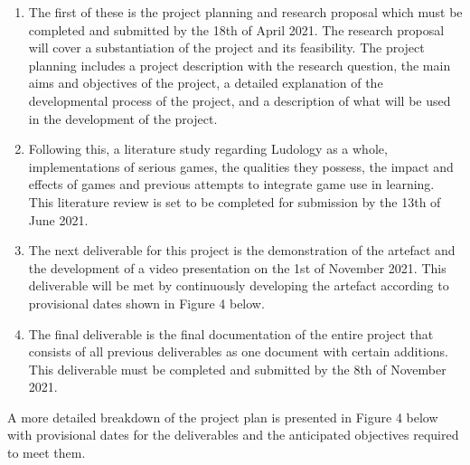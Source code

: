 \begin{enumerate}
\item The first of these is the project planning and research proposal which must be completed and submitted by the 18th of April 2021. The research proposal will cover a substantiation of the project and its feasibility. The project planning includes a project description with the research question, the main aims and objectives of the project, a detailed explanation of the developmental process of the project, and a description of what will be used in the development of the project.

\item Following this, a literature study regarding Ludology as a whole, implementations of serious games, the qualities they possess, the impact and effects of games and previous attempts to integrate game use in learning. This literature review is set to be completed for submission by the 13th of June 2021. 

\item The next deliverable for this project is the demonstration of the artefact and the development of a video presentation on the 1st of November 2021. This deliverable will be met by continuously developing the artefact according to provisional dates shown in Figure 4 below. 

\item The final deliverable is the final documentation of the entire project that consists of all previous deliverables as one document with certain additions. This deliverable must be completed and submitted by the 8th of November 2021.
\end{enumerate}

\noindent A more detailed breakdown of the project plan is presented in Figure 4 below with provisional dates for the deliverables and the anticipated objectives required to meet them.


